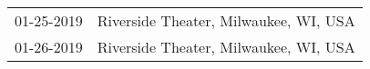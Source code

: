 \begin{supertabular}{ll}
 01-25-2019 &  Riverside Theater, Milwaukee, WI, USA \\
 01-26-2019 &  Riverside Theater, Milwaukee, WI, USA \\
\end{supertabular}
